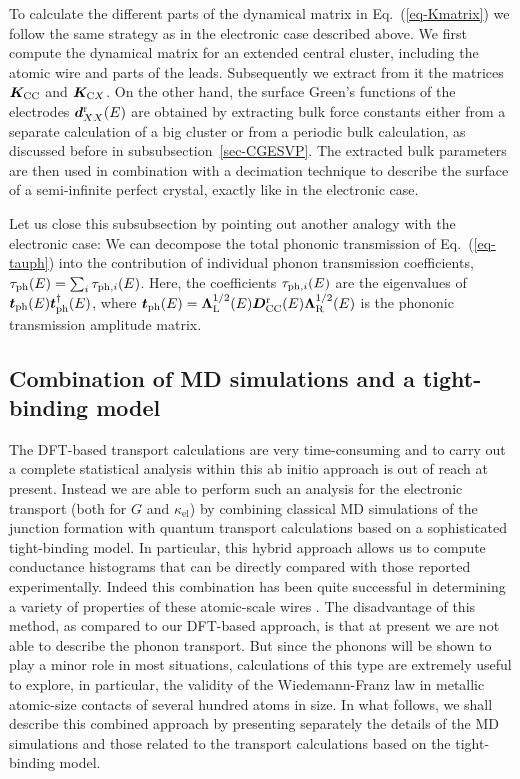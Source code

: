 \documentclass[aps,amsmath,amssymb,twocolumn,showpacs]{revtex4-1}
\begin{document}
To calculate the different parts of the dynamical matrix in
Eq.~(\ref{eq-Kmatrix}) we follow the same strategy as in the electronic case
described above. We first compute the dynamical matrix for an extended central
cluster, including the atomic wire and parts of the leads.  Subsequently we
extract from it the matrices $\boldsymbol K_{\rm CC}$ and $\boldsymbol K_{{\rm
    C}X}$.  On the other hand, the surface Green's functions of the electrodes
$\boldsymbol d_{XX}^{\rm r}(E)$ are obtained by extracting bulk force
constants either from a separate calculation of a big cluster or from a
periodic bulk calculation, as discussed before in subsubsection~\ref{sec-CGESVP}. 
The extracted bulk parameters are then used in combination with a decimation technique
\cite{Pauly2008,Guinea1983} to describe the surface of a semi-infinite perfect
crystal, exactly like in the electronic case.

Let us close this subsubsection by pointing out another
analogy with the electronic case: We can decompose the total phononic
transmission of Eq.~(\ref{eq-tauph}) into the contribution of individual
phonon transmission coefficients, $\tau_{\rm ph}(E) = \sum_i \tau_{{\rm
ph},i}(E)$. Here, the coefficients $\tau_{{\rm ph},i}(E)$ are the
eigenvalues of $\boldsymbol t_{\rm ph}(E) \boldsymbol t^{\dagger}_{\rm
ph}(E)$, where $\boldsymbol t_{\rm ph}(E) = \boldsymbol \Lambda^{1/2}_{\rm
L}(E) \boldsymbol D_{\rm CC}^{\rm r}(E) \boldsymbol \Lambda^{1/2}_{\rm
R}(E)$ is the phononic transmission amplitude matrix.


\subsection{Combination of MD simulations and a tight-binding model} \label{sec-MD}

The DFT-based transport calculations are very time-consuming and to carry out
a complete statistical analysis within this ab initio approach is out of reach
at present. Instead we are able to perform such an analysis for the electronic
transport (both for $G$ and $\kappa_{\text{el}}$) by combining classical MD
simulations of the junction formation with quantum transport calculations
based on a sophisticated tight-binding model. In particular, this hybrid
approach allows us to compute conductance histograms that can be directly
compared with those reported experimentally. Indeed this combination has been
quite successful in determining a variety of properties of these atomic-scale
wires
\cite{Dreher2005,Pauly2006,Pauly2011,Schirm2013,Chen2014,Evangeli2015,Vardimon2016,Cui2017}. The
disadvantage of this method, as compared to our DFT-based approach, is that at
present we are not able to describe the phonon transport. But since the
phonons will be shown to play a minor role in most situations, calculations of
this type are extremely useful to explore, in particular, the validity of the
Wiedemann-Franz law in metallic atomic-size contacts of several hundred atoms
in size. In what follows, we shall describe this combined approach by
presenting separately the details of the MD simulations and those related to
the transport calculations based on the tight-binding model.
\end{document}
